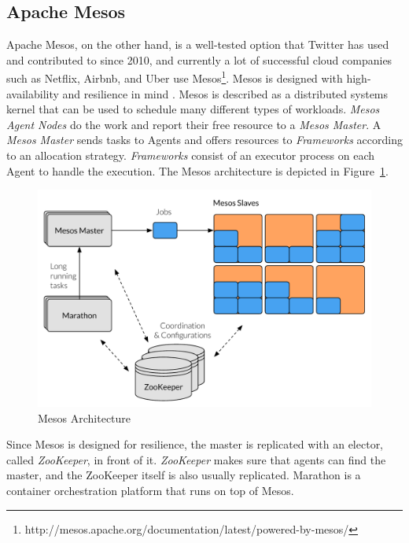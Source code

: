 \subsection*{Apache Mesos}
Apache Mesos, on the other hand, is a well-tested option that Twitter has used and contributed to since 2010, and currently a lot of successful cloud companies such as Netflix, Airbnb, and Uber use Mesos\footnote{http://mesos.apache.org/documentation/latest/powered-by-mesos/}. Mesos is designed with high-availability and resilience in mind \cite{mouat2015orchestration_tools}. Mesos is described as a distributed systems kernel that can be used to schedule many different types of workloads. \textit{Mesos Agent Nodes} do the work and report their free resource to a \textit{Mesos Master}. A \textit{Mesos Master} sends tasks to Agents and offers resources to \textit{Frameworks} according to an allocation strategy. \textit{Frameworks} consist of an executor process on each Agent to handle the execution. The Mesos architecture is depicted in Figure~\ref{fig:mesos_architecture}.

\begin{figure}[H]
    \centering
    \includegraphics[width=12cm]{figures/mesos_architecture}
    \caption{Mesos Architecture}
    \label{fig:mesos_architecture}
\end{figure}

\noindent
Since Mesos is designed for resilience, the master is replicated with an elector, called \textit{ZooKeeper}, in front of it. \textit{ZooKeeper} makes sure that agents can find the master, and the ZooKeeper itself is also usually replicated. Marathon is a container orchestration platform that runs on top of Mesos. 

